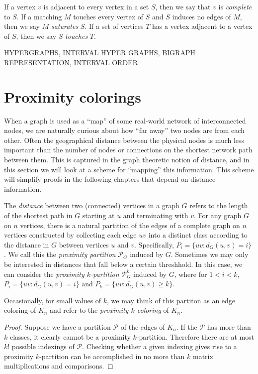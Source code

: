 If a vertex $v$ is adjacent to every vertex in a set $S$, then we say that $v$ is {\it complete} to $S$.  If a matching $M$ touches every vertex of $S$ and $S$ induces no edges of $M$, then we say $M$ {\it saturates} $S$.  If a set of vertices $T$ has a vertex adjacent to a vertex of $S$, then we say $S$ {\it touches} $T$.

HYPERGRAPHS, INTERVAL HYPER GRAPHS, BIGRAPH REPRESENTATION, INTERVAL ORDER

\section{Proximity colorings}

When a graph is used as a ``map'' of some real-world network of interconnected nodes, we are naturally curious about how ``far away'' two nodes are from each other.  Often the geographical distance between the physical nodes is much less important than the number of nodes or connections on the shortest network path between them.  This is captured in the graph theoretic notion of distance, and in this section we will look at a scheme for ``mapping'' this information.  This scheme will simplify proofs in the following chapters that depend on distance information.

The {\it distance} between two (connected) vertices in a graph $G$ refers to the length of the shortest path in $G$ starting at $u$ and terminating with $v$.  For any graph $G$ on $n$ vertices, there is a natural partition of the edges of a complete graph on $n$ vertices constructed by collecting each edge $uv$ into a distinct class according to the distance in $G$ between vertices $u$ and $v$.  Specifically, $P_i = \{uv : d_G(u,v) = i\}$ .  We call this the \textit{proximity partition} $\mathcal{P}_G$ induced by $G$.  Sometimes we may only be interested in distances that fall below a certain threshhold.  In this case, we can consider the \textit{proximity $k$-partition} $\mathcal{P}^k_G$ induced by $G$, where for $1 < i < k$, $P_i = \{uv : d_G(u,v) = i\}$ and $P_k = \{uv : d_G(u,v) \geq k\}$. 

Occasionally, for small values of $k$, we may think of this partiton as an edge coloring of $K_n$ and refer to the \textit{proximity $k$-coloring} of $K_n$. 
 

\begin{proof}
Suppose we have a partition $\mathcal{P}$ of the edges of $K_n$. If the $\mathcal{P}$ has more than $k$ classes, it clearly cannot be a proximity $k$-partition. Therefore there are at most $k!$ possible indexings of $\mathcal{P}$.  Checking whether a given indexing gives rise to a proximity $k$-partition can be accomplished in no more than $k$ matrix multiplications and comparisons.  
\end{proof}

